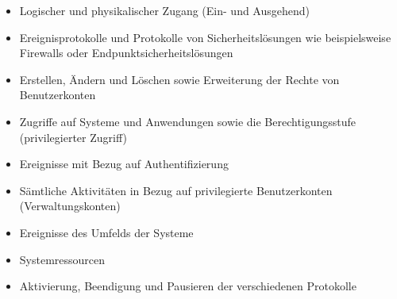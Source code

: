 \documentclass[11pt,a4paper,hidelinks]{article}   %
\begin{document}
            \begin{itemize}
                \item Logischer und physikalischer Zugang (Ein- und Ausgehend)
                \item Ereignisprotokolle und Protokolle von Sicherheitslösungen wie beispielsweise Firewalls oder Endpunktsicherheitslösungen
                \item Erstellen, Ändern und Löschen sowie Erweiterung der Rechte von Benutzerkonten
                \item Zugriffe auf Systeme und Anwendungen sowie die Berechtigungsstufe (privilegierter Zugriff)
                \item Ereignisse mit Bezug auf Authentifizierung
                \item Sämtliche Aktivitäten in Bezug auf privilegierte Benutzerkonten (Verwaltungskonten)
                \item Ereignisse des Umfelds der Systeme
                \item Systemressourcen
                \item Aktivierung, Beendigung und Pausieren der verschiedenen Protokolle
            \end{itemize} 
\end{document}

